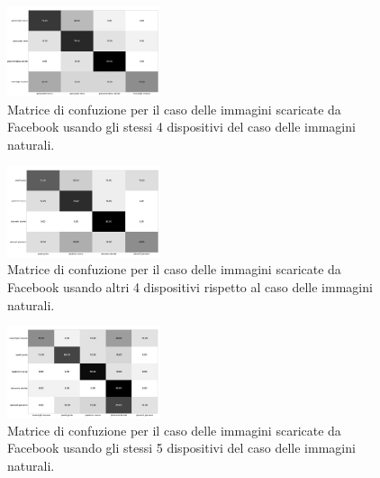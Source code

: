 \begin{figure}[h]
\begin{center}
\includegraphics[width=0.4\textwidth]{images/confusion_matrix_fb_highres_4.png}
\end{center}
  \caption{Matrice di confuzione per il caso delle immagini scaricate da Facebook usando gli stessi 4 dispositivi del caso delle immagini naturali. }
\label{fig:validation}
\end{figure}

\begin{figure}[h]
\begin{center}
\includegraphics[width=0.4\textwidth]{images/confusion_matrix_fb_highres_4_bis.png}
\end{center}
  \caption{Matrice di confuzione per il caso delle immagini scaricate da Facebook usando altri 4 dispositivi rispetto al caso delle immagini naturali. }
\label{fig:validation}
\end{figure}

\begin{figure}[h]
\begin{center}
\includegraphics[width=0.4\textwidth]{images/confusion_matrix_fb_highres_5.png}
\end{center}
  \caption{Matrice di confuzione per il caso delle immagini scaricate da Facebook usando gli stessi 5 dispositivi del caso delle immagini naturali.}
\label{fig:validation}
\end{figure}

